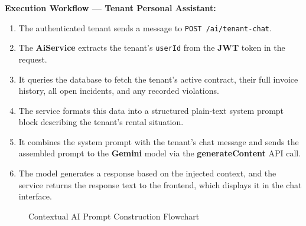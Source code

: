 \textbf{Execution Workflow — Tenant Personal Assistant:}
\begin{enumerate}
    \item The authenticated tenant sends a message to \texttt{POST /ai/tenant-chat}.
    \item The \textbf{AiService} extracts the tenant's \texttt{userId} from the \textbf{JWT} token in the request.
    \item It queries the database to fetch the tenant's active contract, their full invoice history, all open incidents, and any recorded violations.
    \item The service formats this data into a structured plain-text system prompt block describing the tenant's rental situation.
    \item It combines the system prompt with the tenant's chat message and sends the assembled prompt to the \textbf{Gemini} model via the \textbf{generateContent} API call.
    \item The model generates a response based on the injected context, and the service returns the response text to the frontend, which displays it in the chat interface.
\end{enumerate}

\begin{figure}[H]
    \centering
    \caption{Contextual AI Prompt Construction Flowchart}
    \label{fig:ai_prompt_flow}
\end{figure}

